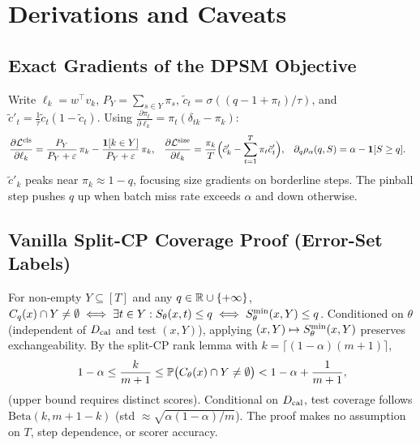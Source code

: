 \documentclass[10pt,a4paper]{article}
\begin{document}
\clearpage
\section{Derivations and Caveats}

\subsection{Exact Gradients of the DPSM Objective}
Write $\ell_k=w^\top v_k$, $P_Y=\sum_{s\in Y}\pi_s$, $\tilde c_t=\sigma((q-1+\pi_t)/\tau)$, and $\tilde c'_t=\frac{1}{\tau}\tilde c_t(1-\tilde c_t)$. Using $\frac{\partial\pi_t}{\partial\ell_k}=\pi_t(\delta_{tk}-\pi_k)$:
\begin{align}
\frac{\partial \mathcal{L}^{\mathrm{cls}}}{\partial \ell_k} &= \frac{P_Y}{P_Y+\varepsilon}\,\pi_k - \frac{\mathbf{1}[k\in Y]}{P_Y+\varepsilon}\,\pi_k, &
\frac{\partial \mathcal{L}^{\mathrm{size}}}{\partial \ell_k} &= \frac{\pi_k}{T}\Big(\tilde c'_k - \sum_{t=1}^T \pi_t\tilde c'_t\Big), &
\partial_q \rho_\alpha(q,S) &= \alpha - \mathbf{1}[S\ge q]. \label{eq:wp1-grads}
\end{align}
$\tilde c'_k$ peaks near $\pi_k \approx 1-q$, focusing size gradients on borderline steps. The pinball step pushes $q$ up when batch miss rate exceeds $\alpha$ and down otherwise.

\subsection{Vanilla Split-CP Coverage Proof (Error-Set Labels)} \label{app:cp-proof}
For non-empty $Y\subseteq[T]$ and any $q\in\mathbb{R}\cup\{+\infty\}$, $C_q(x)\cap Y\neq\emptyset \iff \exists t\in Y: S_\theta(x,t)\le q \iff S^{\min}_\theta(x,Y)\le q$. Conditioned on $\theta$ (independent of $D_{\mathrm{cal}}$ and test $(x,Y)$), applying $(x,Y)\mapsto S^{\min}_\theta(x,Y)$ preserves exchangeability. By the split-CP rank lemma with $k=\lceil(1-\alpha)(m+1)\rceil$,
\[
1-\alpha \le \frac{k}{m+1} \le \mathbb{P}\big(C_\theta(x)\cap Y\neq\emptyset\big) < 1-\alpha + \frac{1}{m+1},
\]
(upper bound requires distinct scores). Conditional on $D_{\mathrm{cal}}$, test coverage follows $\mathrm{Beta}(k,m+1-k)$ (std $\approx\sqrt{\alpha(1-\alpha)/m}$). The proof makes no assumption on $T$, step dependence, or scorer accuracy.
\end{document}
